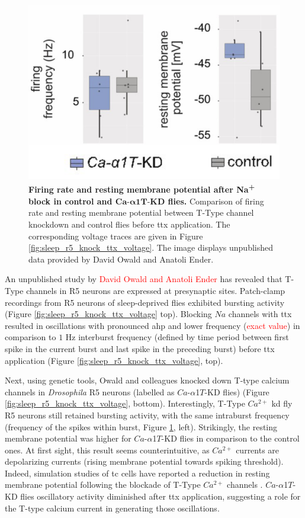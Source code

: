 \documentclass[../main.tex]{subfiles}
\begin{document}
\begin{figure}[!t]
    \centering
    \includegraphics[width=0.5\linewidth]{../img/sleep_and_r5_network/CaaT_knock_and_ttx/frequencies_whole.png}
    \caption[Firing rate and resting membrane potential after $Na$\textsuperscript{+} block in control and $Ca\text{-}\alpha1T\text{-KD}$ flies]{
        \textbf{Firing rate and resting membrane potential after Na\textsuperscript{+} block in control and $\bm{Ca\text{-}\alpha1T\text{-KD}}$ flies.}
        Comparison of firing rate and resting membrane potential between T-Type channel knockdown and control flies before \gls{ttx} application. The corresponding voltage traces are given in Figure \ref{fig:sleep_r5_knock_ttx_voltage}.
        The image displays unpublished data provided by David Owald and Anatoli Ender.
    }
    \label{fig:sleep_r5_knock_ttx_frequencies}
\end{figure}

An unpublished study by \textcolor{red}{David Owald and Anatoli Ender} has revealed that T-Type channels in R5 neurons are expressed at presynaptic sites.
Patch-clamp recordings from R5 neurons of sleep-deprived flies exhibited bursting activity (Figure \ref{fig:sleep_r5_knock_ttx_voltage} top). Blocking $Na$ channels with \gls{ttx} resulted in oscillations with pronounced \gls{ahp} and lower frequency (\textcolor{red}{exact value}) in comparison to $1$ Hz interburst frequency (defined by time period between first spike in the current burst and last spike in the preceding burst) before \gls{ttx} application (Figure \ref{fig:sleep_r5_knock_ttx_voltage}, top).

Next, using genetic tools, Owald and colleagues knocked down T-type calcium channels in \textit{Drosophila} R5 neurons (labelled as $Ca$-$\alpha$1$T$-KD flies) (Figure \ref{fig:sleep_r5_knock_ttx_voltage}, bottom). Interestingly, T-Type $Ca^{2+}$ \gls{kd} fly R5 neurons still retained bursting activity, with the same intraburst frequency (frequency of the spikes within burst, Figure \ref{fig:sleep_r5_knock_ttx_frequencies}, left). Strikingly, the resting membrane potential was higher for $Ca$-$\alpha$1$T$-KD flies in comparison to the control ones. At first sight, this result seems counterintuitive, as $Ca^{2+}$ currents are depolarizing currents (rising membrane potential towards spiking threshold). Indeed, simulation studies of \gls{tc} cells have reported a reduction in resting membrane potential following the blockade of T-Type $Ca^{2+}$ channels \cite{amarilloInterplaySevenSubthreshold2014}.
$Ca$-$\alpha$1$T$-KD flies oscillatory activity diminished after \gls{ttx} application, suggesting a role for the T-type calcium current in generating those oscillations.
\end{document}
